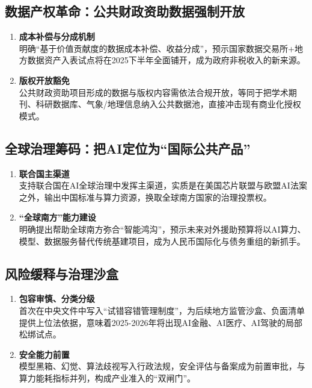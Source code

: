 \subsection{数据产权革命：公共财政资助数据强制开放}
\begin{enumerate}[leftmargin=*, nosep]
    \item \textbf{成本补偿与分成机制}  \\
    明确“基于价值贡献度的数据成本补偿、收益分成”，预示国家数据交易所+地方数据资产入表试点将在2025下半年全面铺开，成为政府非税收入的新来源。
    \item \textbf{版权开放豁免}  \\
    公共财政资助项目形成的数据与版权内容需依法合规开放，等同于把学术期刊、科研数据库、气象/地理信息纳入公共数据池，直接冲击现有商业化授权模式。
\end{enumerate}

\subsection{全球治理筹码：把AI定位为“国际公共产品”}
\begin{enumerate}[leftmargin=*, nosep]
    \item \textbf{联合国主渠道}  \\
    支持联合国在AI全球治理中发挥主渠道，实质是在美国芯片联盟与欧盟AI法案之外，输出中国标准与算力资源，换取全球南方国家的治理投票权。  
    \item \textbf{“全球南方”能力建设  }\\
    明确提出帮助全球南方弥合“智能鸿沟”，预示未来对外援助预算将以AI算力、模型、数据服务替代传统基建项目，成为人民币国际化与债务重组的新抓手。
\end{enumerate}

\subsection{风险缓释与治理沙盒}
\begin{enumerate}[leftmargin=*, nosep]
    \item \textbf{包容审慎、分类分级}  \\
    首次在中央文件中写入“试错容错管理制度”，为后续地方监管沙盒、负面清单提供上位法依据，意味着2025-2026年将出现AI金融、AI医疗、AI驾驶的局部松绑试点。  
    \item \textbf{安全能力前置}  \\
    模型黑箱、幻觉、算法歧视写入行政法规，安全评估与备案成为前置审批，与算力能耗指标并列，构成产业准入的“双闸门”。
\end{enumerate}

